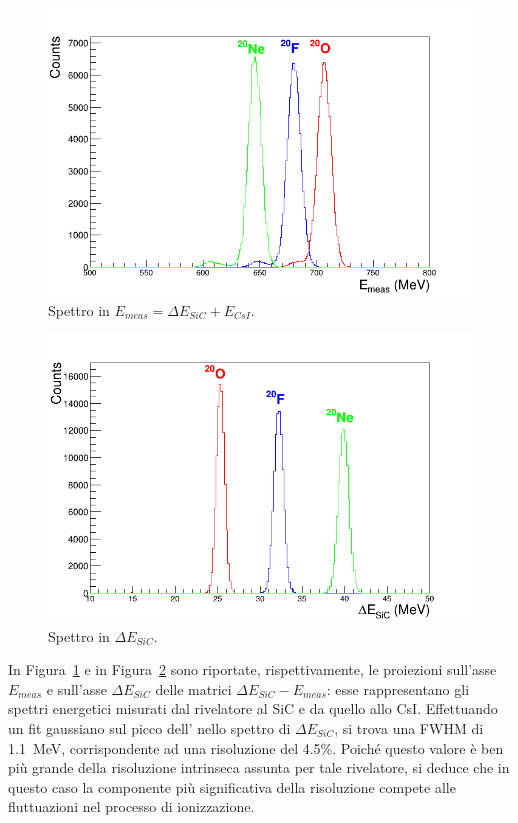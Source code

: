 \begin{figure} [!p]
	\centering
	\includegraphics[scale=0.5]{Grafici_Tesi2/Particelle_monocromatiche/ETot.png}
	\caption{Spettro in $E_{meas} = \Delta E_{SiC} + E_{CsI}$.} \label{fig:ETot}
\end{figure}


\begin{figure} [!p]
	\centering
	\includegraphics[scale=0.5]{Grafici_Tesi2/Particelle_monocromatiche/deltaE.png}
	\caption{Spettro in $ \Delta E_{SiC} $.} \label{fig:deltaE_Tot}
\end{figure}



In Figura~\ref{fig:ETot} e in Figura~\ref{fig:deltaE_Tot} sono riportate, rispettivamente, le proiezioni sull'asse $E_{meas}$ e sull'asse $\Delta E_{SiC}$ delle matrici $\Delta E_{SiC} - E_{meas}$: esse rappresentano gli spettri energetici misurati dal rivelatore al SiC e da quello allo CsI.
Effettuando un fit gaussiano sul picco dell' nello spettro di $\Delta E_{SiC}$, si trova una FWHM di 1.1~MeV, corrispondente ad una risoluzione del 4.5\%.
Poiché questo valore è ben più grande della risoluzione intrinseca assunta per tale rivelatore, si deduce che in questo caso la componente più significativa della risoluzione compete alle fluttuazioni nel processo di ionizzazione.











